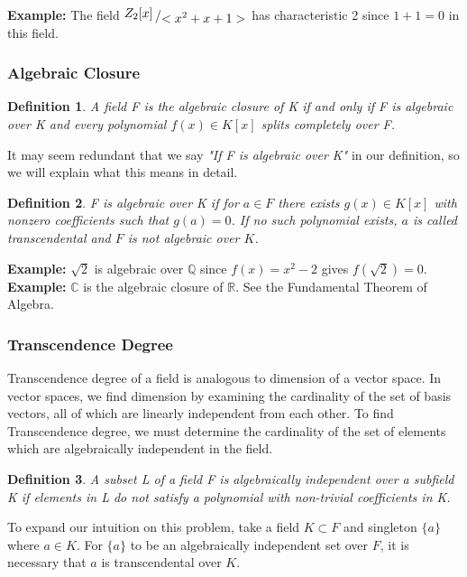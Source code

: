 \documentclass{article}
\newtheorem{defn}{Definition}
\newcommand{\bigslant}[2]{{\raisebox{.2em}{$#1$}\left/\raisebox{-.2em}{$#2$}\right.}}
\begin{document}
\noindent \textbf{Example:} The field $\bigslant{{Z}_{2}[x]}{<x^{2} + x + 1>}$ has characteristic 2 since $1 + 1 = 0$ in this field.

\subsubsection{Algebraic Closure}
\begin{defn}
    A field F is the algebraic closure of K if and only if F is algebraic over K and every polynomial $f(x)\in K[x]$ splits completely over F.
\end{defn}

It may seem redundant that we say \textit{"If F is algebraic over K"} in our definition, so we will explain what this means in detail. 
\begin{defn}
    F is algebraic over K if for $a \in F$ there exists $g(x) \in K[x]$ with nonzero coefficients such that $g(a) = 0$. If no such polynomial exists, $a$ is called transcendental and $F$ is not algebraic over $K$.
\end{defn}

\noindent \textbf{Example:} $\sqrt{2}$ is algebraic over $\mathbb{Q}$ since $f(x) = x^{2} -2$ gives $f(\sqrt{2}) = 0$.\\[.07in]

\noindent\textbf{Example:} $\mathbb{C}$ is the algebraic closure of $\mathbb{R}$. See the Fundamental Theorem of Algebra.

\subsubsection{Transcendence Degree} 
Transcendence degree of a field is analogous to dimension of a vector space. In vector spaces, we find dimension by examining the cardinality of the set of basis vectors, all of which are linearly independent from each other. To find Transcendence degree, we must determine the cardinality of the set of elements which are algebraically independent in the field.

\begin{defn}
    A subset L of a field F is algebraically independent over a subfield K if elements in L do not satisfy a polynomial with non-trivial coefficients in K.
\end{defn}

To expand our intuition on this problem, take a field $K \subset F$ and singleton $\{a\}$ where $a \in K$. For $\{a\}$ to be an algebraically independent set over $F$, it is necessary that $a$ is transcendental over $K$. \\[.07in]
\end{document}
